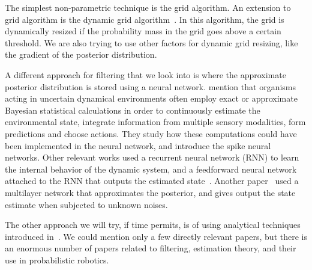 The simplest non-parametric technique is the grid algorithm. An extension to grid algorithm is the dynamic grid algorithm~\cite{grid1,prob}. In this algorithm, the grid is dynamically resized if the probability mass in the grid goes above a certain threshold. We are also trying to use other factors for dynamic grid resizing, like the gradient of the posterior distribution.

A different approach for filtering that we look into is where the approximate posterior distribution is stored using a neural network. \cite{neuspike1} mention that organisms acting in uncertain dynamical environments often employ exact or approximate Bayesian statistical calculations in order to continuously estimate the environmental state, integrate information from multiple sensory modalities, form predictions and choose actions. They study how these computations could have been implemented in the neural network, and introduce the spike neural networks. Other relevant works used a recurrent neural network (RNN) to learn the internal behavior of the dynamic system, and a feedforward neural network attached to the RNN that outputs the estimated state~\cite{neu5,neu1,neu2}. Another paper~\cite{neu4} used a multilayer network that approximates the posterior, and gives output the state estimate when subjected to unknown noises.

The other approach we will try, if time permits, is of using analytical techniques introduced in~\cite{anl1, anl2, anl3}. We could mention only a few directly relevant papers, but there is an enormous number of papers related to filtering, estimation theory, and their use in probabilistic robotics. 
